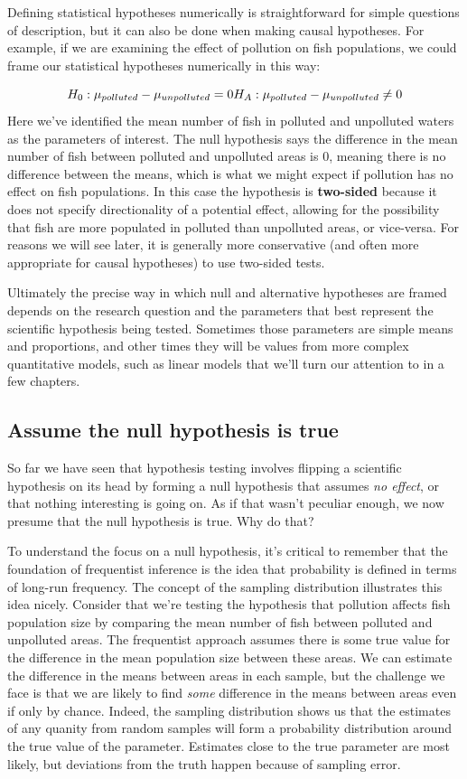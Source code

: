 \documentclass[
]{book}
\begin{document}
Defining statistical hypotheses numerically is straightforward for simple questions of description, but it can also be done when making causal hypotheses. For example, if we are examining the effect of pollution on fish populations, we could frame our statistical hypotheses numerically in this way:

\[
H_0: \mu_{polluted}-\mu_{unpolluted}=0 \\
H_A: \mu_{polluted}-\mu_{unpolluted}\neq0
\] Here we've identified the mean number of fish in polluted and unpolluted waters as the parameters of interest. The null hypothesis says the difference in the mean number of fish between polluted and unpolluted areas is 0, meaning there is no difference between the means, which is what we might expect if pollution has no effect on fish populations. In this case the hypothesis is \textbf{two-sided} because it does not specify directionality of a potential effect, allowing for the possibility that fish are more populated in polluted than unpolluted areas, or vice-versa. For reasons we will see later, it is generally more conservative (and often more appropriate for causal hypotheses) to use two-sided tests.

Ultimately the precise way in which null and alternative hypotheses are framed depends on the research question and the parameters that best represent the scientific hypothesis being tested. Sometimes those parameters are simple means and proportions, and other times they will be values from more complex quantitative models, such as linear models that we'll turn our attention to in a few chapters.

\subsection{Assume the null hypothesis is true}\label{assume-the-null-hypothesis-is-true}

So far we have seen that hypothesis testing involves flipping a scientific hypothesis on its head by forming a null hypothesis that assumes \emph{no effect}, or that nothing interesting is going on. As if that wasn't peculiar enough, we now presume that the null hypothesis is true. Why do that?

To understand the focus on a null hypothesis, it's critical to remember that the foundation of frequentist inference is the idea that probability is defined in terms of long-run frequency. The concept of the sampling distribution illustrates this idea nicely. Consider that we're testing the hypothesis that pollution affects fish population size by comparing the mean number of fish between polluted and unpolluted areas. The frequentist approach assumes there is some true value for the difference in the mean population size between these areas. We can estimate the difference in the means between areas in each sample, but the challenge we face is that we are likely to find \emph{some} difference in the means between areas even if only by chance. Indeed, the sampling distribution shows us that the estimates of any quanity from random samples will form a probability distribution around the true value of the parameter. Estimates close to the true parameter are most likely, but deviations from the truth happen because of sampling error.
\end{document}
